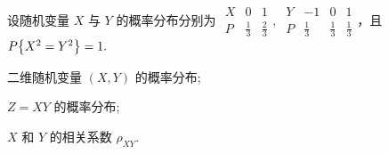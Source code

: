 \begin{example}[2011 数一]
    设随机变量 $X$ 与 $Y$ 的概率分布分别为 $\begin{array}{c|cc}
            X & 0           & 1           \\\hline
            P & \frac{1}{3} & \frac{2}{3}
        \end{array},~\begin{array}{c|ccc}
            Y & -1          & 0           & 1           \\\hline
            P & \frac{1}{3} & \frac{1}{3} & \frac{1}{3}
        \end{array}$，且 $P\qty{X^2=Y^2}=1.$\newline
    \begin{enumerate*}[label=(\arabic{*})]
        \item 二维随机变量 $(X,Y)$ 的概率分布;
        \item $Z=XY$ 的概率分布;
        \item $X$ 和 $Y$ 的相关系数 $\rho_{XY}$.
    \end{enumerate*}
\end{example}
